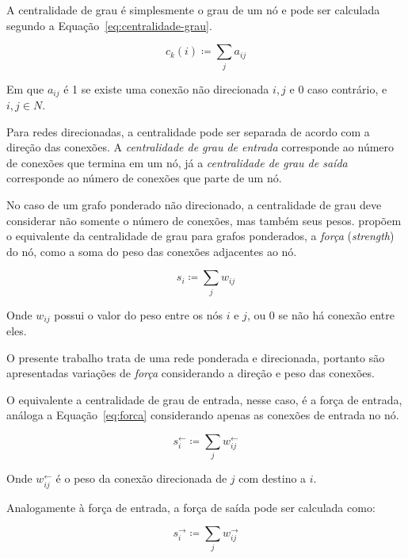 \documentclass[12pt,a4paper]{article}
\theoremstyle{hypo}
\newcommand{\defn}{\coloneqq} %
\newcommand{\linkin}[1]{#1^\leftarrow} %
\newcommand{\linkout}[1]{#1^\rightarrow} %
\newcommand{\win}{w^\leftarrow} %
\newcommand{\wout}{w^\rightarrow} %
\begin{document}
A centralidade de grau é simplesmente o grau de um nó e pode ser calculada segundo a Equação~\ref{eq:centralidade-grau}.

\begin{equation} \label{eq:centralidade-grau}
c_k(i) \defn \sum_{j} a_{ij}
\end{equation}

Em que $a_{ij}$ é 1 se existe uma conexão não direcionada $i, j$ e 0 caso contrário, e $i,j \in N$. 

Para redes direcionadas, a centralidade pode ser separada de acordo com a direção das conexões. A \textit{centralidade de grau de entrada} corresponde ao número de conexões que termina em um nó, já a \textit{centralidade de grau de saída} corresponde ao número de conexões que parte de um nó.

No caso de um grafo ponderado não direcionado, a centralidade de grau deve considerar não somente o número de conexões, mas também seus pesos.  propõem o equivalente da centralidade de grau para grafos ponderados, a \textit{força} (\textit{strength}) do nó, como a soma do peso das conexões adjacentes ao nó.

\begin{equation} \label{eq:forca}
s_i \defn \sum_{j} w_{ij}
\end{equation}

Onde $w_{ij}$ possui o valor do peso entre os nós $i$ e $j$, ou 0 se não há conexão entre eles.

O presente trabalho trata de uma rede ponderada e direcionada, portanto são apresentadas variações de \textit{força} considerando a direção e peso das conexões.

O equivalente a centralidade de grau de entrada, nesse caso, é a força de entrada, análoga a Equação~\ref{eq:forca} considerando apenas as conexões de entrada no nó.

\begin{equation} \label{eq:forca-entrada}
\linkin{s}_i \defn \sum_{j} \win_{ij}
\end{equation}

Onde $\win_{ij}$ é o peso da conexão direcionada de $j$ com destino a $i$.

Analogamente à força de entrada, a força de saída pode ser calculada como:

\begin{equation} \label{eq:forca-saida}
\linkout{s}_i \defn \sum_{j} \wout_{ij}
\end{equation}
\end{document}
